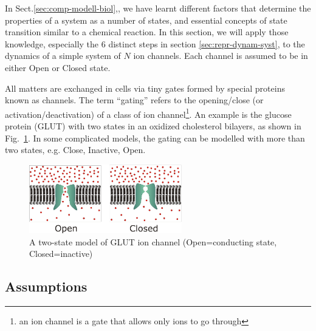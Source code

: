 In Sect.\ref{sec:comp-modell-biol},, we have learnt different factors that
determine the properties of a system as a number of states, and essential
concepts of state transition similar to a chemical reaction. In this section, we
will apply those knowledge, especially the 6 distinct steps in section
\ref{sec:repr-dynam-syst}, to the dynamics of a simple system of $N$ ion
channels. Each channel is assumed to be in either Open or Closed state.

\begin{framed}

  All matters are exchanged in cells via tiny gates formed by special proteins
  known as channels.  The term ``gating'' refers to the opening/close (or
  activation/deactivation) of a class of ion channel\footnote{an ion channel is
  a gate that allows only ions to go through}. An example is the glucose protein
  (GLUT) with two states in an oxidized cholesterol bilayers, as shown in
  Fig.~\ref{fig:ionchannel}.
  In some complicated models, the gating can be modelled with more than two
  states, e.g. Close, Inactive, Open.
\end{framed}

\begin{figure}[htb]
  \centerline{\includegraphics[height=3cm]{./images/ion_channel_state.eps}}
  \caption{A two-state model of GLUT ion channel (Open=conducting state,
  Closed=inactive)}
  \label{fig:ionchannel}
\end{figure}


\subsection{Assumptions}

